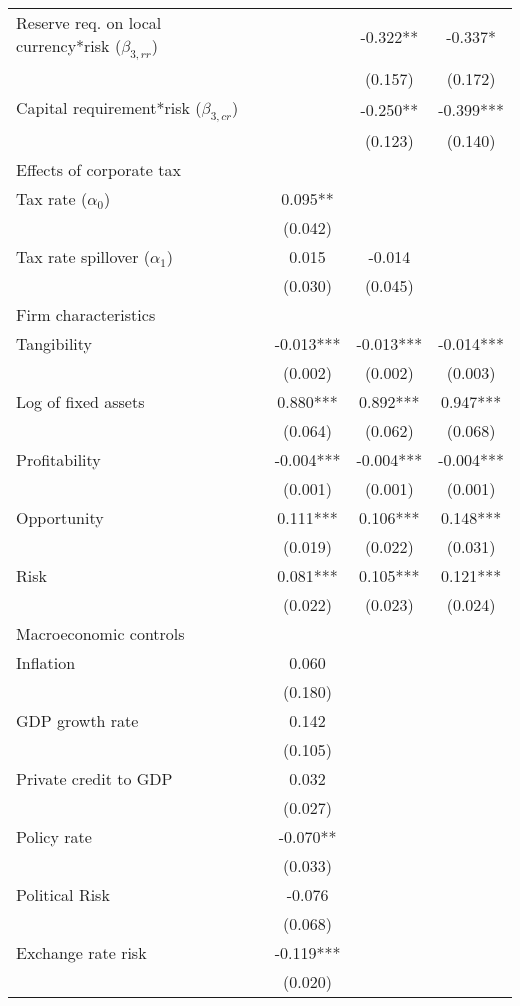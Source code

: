 \begin{longtable}{lccc}
\quad Reserve req. on local currency*risk ($\beta_{3,rr}$) &  & -0.322** & -0.337* \\
 &  & (0.157) & (0.172) \\
\quad Capital requirement*risk ($\beta_{3,cr}$) &  & -0.250** & -0.399*** \\
 &  & (0.123) & (0.140) \\
 Effects of corporate tax &  &  &  \\
\quad Tax rate ($\alpha_{0}$) & 0.095** &  &  \\
 & (0.042) &  &  \\
\quad Tax rate spillover ($\alpha_{1}$) & 0.015 & -0.014 &  \\
 & (0.030) & (0.045) &  \\
  Firm characteristics &  &  &  \\
\quad Tangibility & -0.013*** & -0.013*** & -0.014*** \\
 & (0.002) & (0.002) & (0.003) \\
\quad Log of fixed assets & 0.880*** & 0.892*** & 0.947*** \\
 & (0.064) & (0.062) & (0.068) \\
\quad Profitability & -0.004*** & -0.004*** & -0.004*** \\
 & (0.001) & (0.001) & (0.001) \\
\quad Opportunity & 0.111*** & 0.106*** & 0.148*** \\
 & (0.019) & (0.022) & (0.031) \\
\quad Risk & 0.081*** & 0.105*** & 0.121*** \\
 & (0.022) & (0.023) & (0.024) \\
   Macroeconomic controls &  &  &  \\
\quad Inflation & 0.060 &  &  \\
 & (0.180) &  &  \\
\quad GDP growth rate & 0.142 &  &  \\
 & (0.105) &  &  \\
\quad Private credit to GDP & 0.032 &  &  \\
 & (0.027) &  &  \\
\quad Policy rate & -0.070** &  &  \\
 & (0.033) &  &  \\
\quad Political Risk & -0.076 &  &  \\
 & (0.068) &  &  \\
\quad Exchange rate risk & -0.119*** &  &  \\
 & (0.020) &  &  \\

\end{longtable}
